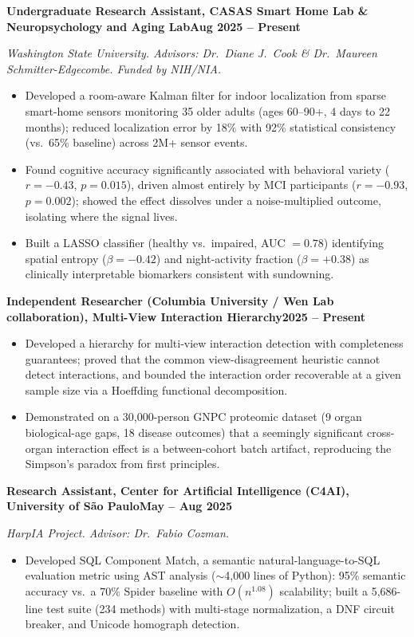 \documentclass[10pt]{article}
\newcommand{\role}[2]{\noindent\textbf{#1}\hfill\textbf{#2}\par}
\newcommand{\sub}[1]{\noindent\textit{#1}\par\vspace{1.5pt}}
\begin{document}
\role{Undergraduate Research Assistant, CASAS Smart Home Lab \& Neuropsychology and Aging Lab}{Aug 2025 -- Present}
\sub{Washington State University. Advisors: Dr.\ Diane J.\ Cook \& Dr.\ Maureen Schmitter-Edgecombe. Funded by NIH/NIA.}
\begin{itemize}
\item Developed a room-aware Kalman filter for indoor localization from sparse smart-home sensors monitoring 35 older adults (ages 60--90+, 4 days to 22 months); reduced localization error by 18\% with 92\% statistical consistency (vs.\ 65\% baseline) across 2M+ sensor events.
\item Found cognitive accuracy significantly associated with behavioral variety ($r=-0.43$, $p=0.015$), driven almost entirely by MCI participants ($r=-0.93$, $p=0.002$); showed the effect dissolves under a noise-multiplied outcome, isolating where the signal lives.
\item Built a LASSO classifier (healthy vs.\ impaired, AUC $=0.78$) identifying spatial entropy ($\beta=-0.42$) and night-activity fraction ($\beta=+0.38$) as clinically interpretable biomarkers consistent with sundowning.
\end{itemize}

\role{Independent Researcher (Columbia University / Wen Lab collaboration), Multi-View Interaction Hierarchy}{2025 -- Present}
\begin{itemize}
\item Developed a hierarchy for multi-view interaction detection with completeness guarantees; proved that the common view-disagreement heuristic cannot detect interactions, and bounded the interaction order recoverable at a given sample size via a Hoeffding functional decomposition.
\item Demonstrated on a 30,000-person GNPC proteomic dataset (9 organ biological-age gaps, 18 disease outcomes) that a seemingly significant cross-organ interaction effect is a between-cohort batch artifact, reproducing the Simpson's paradox from first principles.
\end{itemize}

\role{Research Assistant, Center for Artificial Intelligence (C4AI), University of S\~ao Paulo}{May -- Aug 2025}
\sub{HarpIA Project. Advisor: Dr.\ Fabio Cozman.}
\begin{itemize}
\item Developed SQL Component Match, a semantic natural-language-to-SQL evaluation metric using AST analysis ($\sim$4,000 lines of Python): 95\% semantic accuracy vs.\ a 70\% Spider baseline with $O(n^{1.08})$ scalability; built a 5,686-line test suite (234 methods) with multi-stage normalization, a DNF circuit breaker, and Unicode homograph detection.
\end{itemize}
\end{document}
